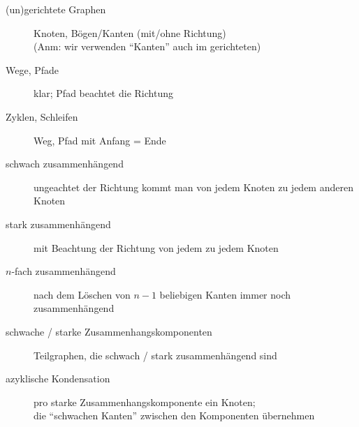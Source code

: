 \begin{description}
	\item[(un)gerichtete Graphen] Knoten, Bögen/Kanten (mit/ohne Richtung)\\(Anm: wir verwenden ``Kanten'' auch im gerichteten)
	\item[Wege, Pfade] klar; Pfad beachtet die Richtung
	\item[Zyklen, Schleifen] Weg, Pfad mit Anfang = Ende
	\item[schwach zusammenhängend] ungeachtet der Richtung kommt man von jedem Knoten zu jedem anderen Knoten
	\item[stark zusammenhängend] mit Beachtung der Richtung von jedem zu jedem Knoten
	\item[$n$-fach zusammenhängend] nach dem Löschen von $n\!-\!1$ beliebigen Kanten immer noch zusammenhängend
	\item[schwache / starke Zusammenhangskomponenten] Teilgraphen, die schwach / stark zusammenhängend sind
	\item[azyklische Kondensation] pro starke Zusammenhangskomponente ein Knoten;\\die ``schwachen Kanten'' zwischen den Komponenten übernehmen
\end{description}


